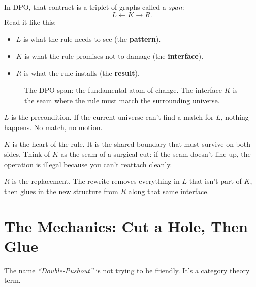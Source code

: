 In DPO, that contract is a triplet of graphs called a \emph{span}:
\[
L \leftarrow K \rightarrow R .
\]
Read it like this:

\begin{itemize}
    \item $L$ is what the rule needs to see (the \textbf{pattern}).
    \item $K$ is what the rule promises not to damage (the \textbf{interface}).
    \item $R$ is what the rule installs (the \textbf{result}).
\end{itemize}

\begin{figure}[h]
    \centering
    \caption{The DPO span: the fundamental atom of change. The interface $K$ is the seam where the rule must match the surrounding universe.}
    \label{fig:dpo-span}
\end{figure}

$L$ is the precondition. If the current universe can't find a match for $L$, nothing happens. No match, no motion.

$K$ is the heart of the rule. It is the shared boundary that must survive on both sides. Think of $K$ as the seam of a surgical cut: if the seam doesn't line up, the operation is illegal because you can't reattach cleanly.

$R$ is the replacement. The rewrite removes everything in $L$ that isn't part of $K$, then glues in the new structure from $R$ along that same interface.

\section{The Mechanics: Cut a Hole, Then Glue}
\label{sec:dpo-mechanics}

The name \textit{``Double-Pushout''} is not trying to be friendly. It's a category theory term.

